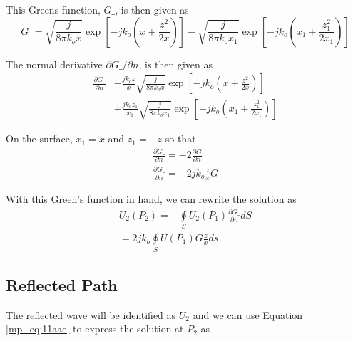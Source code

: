 \noindent This Greens function, $G\_$, is then given as
\begin{equation}
G\_= \sqrt{\frac{j}{8\pi k_ox}}\exp\left[-jk_o\left(x + \frac{z^2}{2x}\right) \right] - \sqrt{\frac{j}{8\pi k_ox_1}}\exp\left[-jk_o\left(x_1 + \frac{z_1^2}{2x_1}\right) \right]
\label{mp_eq:11aab}
\end{equation}
\renewcommand{\baselinestretch}{2} \small\normalsize

\noindent The normal derivative $\partial G\_/\partial n$, is then given as
\begin{equation}
\begin{aligned}
\frac{\partial G\_}{\partial n}&-\frac{jk_oz}{x}\sqrt{\frac{j}{8\pi k_ox}}\exp\left[-jk_o\left(x + \frac{z^2}{2x}\right) \right] \\
&+\frac{jk_oz_1}{x_1}\sqrt{\frac{j}{8\pi k_ox_1}}\exp\left[-jk_o\left(x_1 + \frac{z_1^2}{2x_1}\right) \right]
\end{aligned}
\label{mp_eq:11aac}
\end{equation}
\renewcommand{\baselinestretch}{2} \small\normalsize

\noindent On the surface, $x_1 = x$ and $z_1 = -z$ so that
\begin{equation}
\begin{gathered}
\frac{\partial G\_}{\partial n} = -2\frac{\partial G}{\partial n} \\
\frac{\partial G\_}{\partial n} = -2jk_o\frac{z}{x}G
\end{gathered}
\label{mp_eq:11aad}
\end{equation}
\renewcommand{\baselinestretch}{2} \small\normalsize

\noindent With this Green's function in hand, we can rewrite the solution as
\begin{equation}
\begin{gathered}
U_2(P_2) = -\oint\limits_{S}U_2(P_1)\frac{\partial G\_}{\partial n}dS\\
= 2jk_o\oint\limits_{S}U(P_1)G\frac{z}{x}ds
\end{gathered}
\label{mp_eq:11aae}
\end{equation}
\renewcommand{\baselinestretch}{2} \small\normalsize

\subsection{Reflected Path}
The reflected wave will be identified as $U_2$ and we can use Equation \ref{mp_eq:11aae} to express the solution at $P_2$ as

